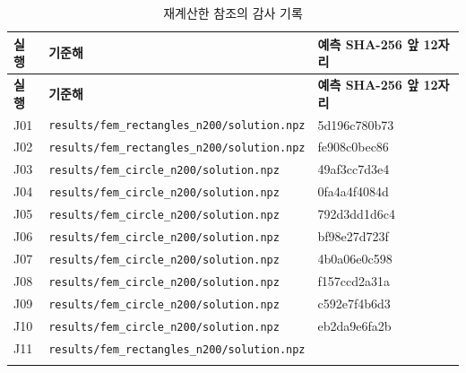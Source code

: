 \documentclass[10pt,a4paper]{article}
\begin{document}
\begin{longtable}{>{\raggedright\arraybackslash}p{}>{\raggedright\arraybackslash}p{}>{\raggedright\arraybackslash}p{}}

\caption{재계산한 참조의 감사 기록}\\

\rowcolor{tint} \textbf{실행} & \textbf{기준해} & \textbf{예측 SHA-256 앞 12자리}\\\midrule\endfirsthead

\rowcolor{tint} \textbf{실행} & \textbf{기준해} & \textbf{예측 SHA-256 앞 12자리}\\\midrule\endhead

\bottomrule\endfoot

J01 & \nolinkurl{results/fem_rectangles_n200/solution.npz} & 5d196c780b73\\\addlinespace[1pt]

J02 & \nolinkurl{results/fem_rectangles_n200/solution.npz} & fe908c0bec86\\\addlinespace[1pt]

J03 & \nolinkurl{results/fem_circle_n200/solution.npz} & 49af3cc7d3e4\\\addlinespace[1pt]

J04 & \nolinkurl{results/fem_circle_n200/solution.npz} & 0fa4a4f4084d\\\addlinespace[1pt]

J05 & \nolinkurl{results/fem_circle_n200/solution.npz} & 792d3dd1d6c4\\\addlinespace[1pt]

J06 & \nolinkurl{results/fem_circle_n200/solution.npz} & bf98e27d723f\\\addlinespace[1pt]

J07 & \nolinkurl{results/fem_circle_n200/solution.npz} & 4b0a06e0c598\\\addlinespace[1pt]

J08 & \nolinkurl{results/fem_circle_n200/solution.npz} & f157ccd2a31a\\\addlinespace[1pt]

J09 & \nolinkurl{results/fem_circle_n200/solution.npz} & c592e7f4b6d3\\\addlinespace[1pt]

J10 & \nolinkurl{results/fem_circle_n200/solution.npz} & eb2da9e6fa2b\\\addlinespace[1pt]

J11 & \nolinkurl{results/fem_rectangles_n200/solution.npz} & 704638945474\\\addlinespace[1pt]


\end{longtable}
\end{document}
